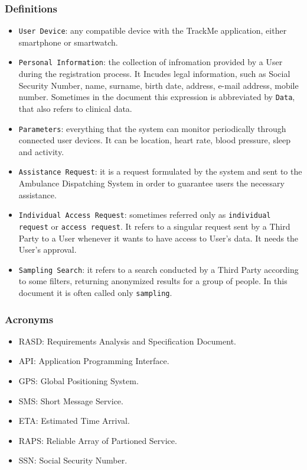 \documentclass[12pt,a4paper]{article}
\begin{document}
		\subsubsection{Definitions}
			\begin{itemize}
				\item \texttt{User Device}: any compatible device with the TrackMe application, either smartphone or smartwatch.
				\item \texttt{Personal Information}: the collection of infromation provided by a User during the registration process. It Incudes legal information, such as Social Security Number, name, surname, birth date, address, e-mail address, mobile number. Sometimes in the document this expression is abbreviated by \texttt{Data}, that also refers to clinical data.
				\item \texttt{Parameters}: everything that the system can monitor periodically through connected user devices. It can be location, heart rate, blood pressure, sleep and activity.
				\item \texttt{Assistance Request}: it is a request formulated by the system and sent to the Ambulance Dispatching System in order to guarantee users the necessary assistance.
				\item \texttt{Individual Access Request}: sometimes referred only as \texttt{individual request} or \texttt{access request}. It refers to a singular request sent by a Third Party to a User whenever it wants to have access to User's data. It needs the User's approval. 
				\item \texttt{Sampling Search}: it refers to a search conducted by a Third Party according to some filters, returning anonymized results for a group of people. In this document it is often called only \texttt{sampling}.
			\end{itemize}
		\subsubsection{Acronyms}
			\begin{itemize}
				\item RASD: Requirements Analysis and Specification Document.
				\item API: Application Programming Interface.
				\item GPS: Global Positioning System.
				\item SMS: Short Message Service.
				\item ETA: Estimated Time Arrival.
				\item RAPS: Reliable Array of Partioned Service.
				\item SSN: Social Security Number.
			\end{itemize}
\end{document}
